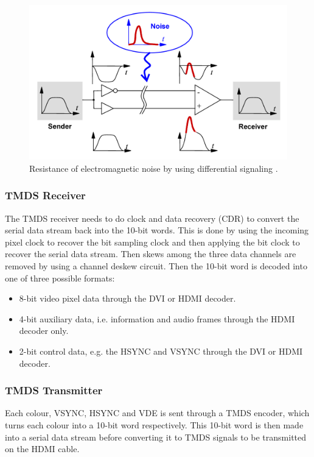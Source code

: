 \begin{figure}[h]
    \centering
    \includegraphics{img/DiffSignaling.png}
    \caption[Resistance of electromagnetic noise by using differential signaling]{
        Resistance of electromagnetic noise by using differential signaling \cite{wikids}.
    }
    \label{fig:differential_signal}
\end{figure}

\subsubsection{TMDS Receiver}
The TMDS receiver needs to do clock and data recovery (CDR) to convert the serial data stream back into the 10-bit words.
This is done by using the incoming pixel clock to recover the bit sampling clock and then applying the bit clock to recover the serial data stream.
Then skews among the three data channels are removed by using a channel deskew circuit.
Then the 10-bit word is decoded into one of three possible formats:
\begin{itemize}
    \item   8-bit video pixel data through the DVI or HDMI decoder.
    \item   4-bit auxiliary data, i.e. information and audio frames through the HDMI decoder only.
    \item   2-bit control data, e.g. the HSYNC and VSYNC through the DVI or HDMI decoder.
\end{itemize}

\subsubsection{TMDS Transmitter}
Each colour, VSYNC, HSYNC and VDE is sent through a TMDS encoder, which turns each colour into a 10-bit word respectively. This 10-bit word is then made into a serial data stream before converting it to TMDS signals to be transmitted on the HDMI cable.

